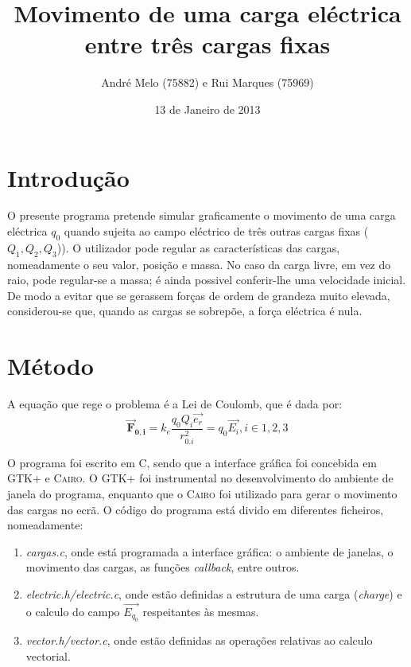 \documentclass[a4paper,11pt]{article}
\author{André Melo (75882) e Rui Marques (75969)}
\title{Movimento de uma carga eléctrica entre três cargas fixas}
\date{13 de Janeiro de 2013}
\begin{document}
\maketitle
\section{Introdução}
O presente programa pretende simular graficamente o movimento de uma carga eléctrica $q_{0}$ quando sujeita ao campo eléctrico de três outras cargas fixas ($Q_{1},Q_{2},Q_{3}$)). O utilizador pode regular as características das cargas,  nomeadamente o  seu valor, posição e massa. No caso da carga livre, em vez do raio, pode regular-se a massa; é ainda possivel conferir-lhe uma velocidade inicial. De modo a evitar que se gerassem forças de ordem de grandeza muito elevada, considerou-se que, quando as cargas se sobrepõe, a força eléctrica é nula.
\section{Método}
A equação que rege o problema é a Lei de Coulomb, que é dada por:
\begin{equation}
\mathbf{\vec{F}_{0,i}} = k_{e}\frac{q_{0}Q_{i}\vec{e_{r}}}{r^{2}_{0.i}}=q_{0}\vec{E_{i}}, i\in{1,2,3}
\end{equation}


O programa foi escrito em C, sendo que a interface gráfica foi concebida em \textsc{GTK+} e \textsc{Cairo}. O \textsc{GTK+} foi instrumental no desenvolvimento do ambiente de janela do programa, enquanto que o \textsc{Cairo} foi utilizado para gerar o movimento das cargas no ecrã.
O código do programa está divido em diferentes ficheiros, nomeadamente:
\begin{enumerate}
\item \emph{cargas.c}, onde está programada a interface gráfica: o ambiente de janelas, o movimento das cargas, as funções \emph{callback}, entre outros.
\item \emph{electric.h/electric.c}, onde estão definidas a estrutura de uma carga (\emph{charge}) e o calculo do campo $\vec{E_{q_{0}}}$ respeitantes às mesmas.
\item \emph{vector.h/vector.c}, onde estão definidas as operações relativas ao calculo vectorial.
\end{enumerate}
\end{document}

